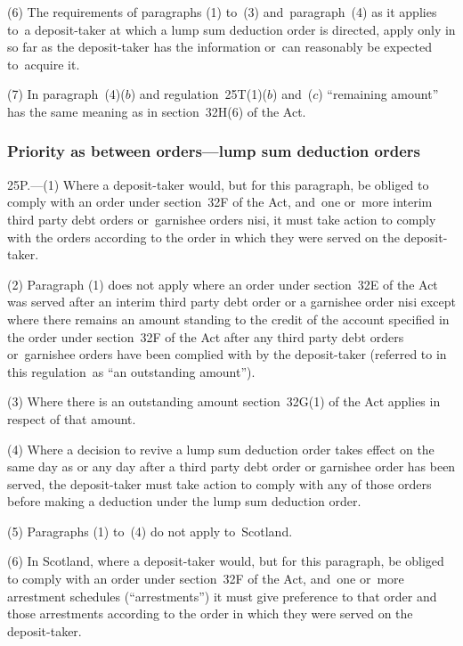 \documentclass[12pt,a4paper]{article}
\begin{document}
(6) The requirements of paragraphs (1) to~(3) and~paragraph~(4) as it applies to~a deposit-taker at which a lump sum deduction order is directed, apply only in so far as the deposit-taker has the information or~can reasonably be expected to~acquire it.

(7) In paragraph~(4)($b$)  and regulation~25T(1)($b$)  and~($c$)  “remaining amount” has the same meaning as in section~32H(6) of the Act.


\subsubsection[25P. Priority as between orders---lump sum deduction orders]{Priority as between orders---lump sum deduction orders}

25P.---(1)  Where a deposit-taker would, but for this paragraph, be obliged to comply with an order under section~32F of the Act, and~one or~more interim third party debt orders or~garnishee orders nisi, it must take action to comply with the orders according to the order in which they were served on the deposit-taker.

(2) Paragraph (1) does not apply where an order under section~32E of the Act was served after an interim third party debt order or a garnishee order nisi except where there remains an amount standing to the credit of the account specified in the order under section~32F of the Act after any third party debt orders or~garnishee orders have been complied with by the deposit-taker (referred to in this regulation~as “an outstanding amount”).

(3) Where there is an outstanding amount section~32G(1) of the Act applies in respect of that amount.

(4) Where a decision to revive a lump sum deduction order takes effect on the same day as or any day after a third party debt order or garnishee order has been served, the deposit-taker must take action to comply with any of those orders before making a deduction under the lump sum deduction order.

(5) Paragraphs (1) to~(4) do not apply to~Scotland.

(6) In Scotland, where a deposit-taker would, but for this paragraph, be obliged to comply with an order under section~32F of the Act, and~one or~more arrestment schedules (“arrestments”) it must give preference to that order and those arrestments according to the order in which they were served on the deposit-taker.
\end{document}
